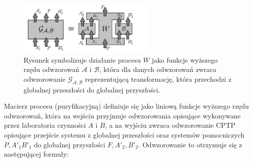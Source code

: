 \documentclass[10pt]{article} %
\begin{document}
\begin{figure}[t]
\centering
\includegraphics[width=0.6\textwidth]{obrazki/done1}
\caption{
Rysunek symbolizuje działanie procesu $W$ jako funkcje wyższego rzędu odwzorowań $\mathcal{A}$ i $\mathcal{B}$, która dla danych odwzorowań zwraca odwzorowanie 
$\mathcal{G_{A,B}}$ reprezentującą transformację, która przechodzi z globalnej przeszłości do globalnej przyszłości.
}
\label{higherordermap}
\end{figure}
Macierz procesu (puryfikacyjną) definiuje się jako liniową funkcje wyższego rzędu odwzorowań, która na wejściu przyjmuje odwzorowania opisujące wykonywane przez laboratoria czynności $A$ i $B$, a na wyjściu zwraca odwzorowanie CPTP opisujące przejście systemu z globalnej przeszłości oraz systemów pomocniczych $P, A'_1 B'_1$ do globalnej przyszłości $F, A'_2, B'_2$. Odwzorowanie to otrzymuje się z następującej formuły:
\end{document}
